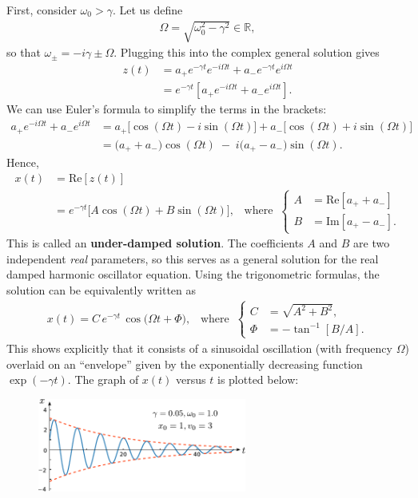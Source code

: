 \documentclass[10pt,a4paper]{article}
\begin{document}
First, consider $\omega_0 > \gamma$.  Let us define
\begin{align}
  \Omega = \sqrt{\omega_0^2 - \gamma^2} \in \mathbb{R},
\end{align}
so that $\omega_\pm = -i\gamma \pm \Omega$. Plugging this into the
complex general solution gives
\begin{align}
  z(t) &= a_+ e^{-\gamma t} e^{-i\Omega t} + a_- e^{-\gamma t} e^{i\Omega t} \\
  &= e^{-\gamma t} \left[a_+ e^{-i\Omega t} + a_- e^{i\Omega t} \right].
\end{align}
We can use Euler's formula to simplify the terms in the brackets:
\begin{align}
  a_+ e^{-i\Omega t} + a_- e^{i\Omega t} &= a_+ \big[\cos(\Omega t)-i\sin(\Omega t)\big] + a_- \big[\cos(\Omega t)+i\sin(\Omega t)\big] \\
  &= \big(a_+ + a_-\big) \cos(\Omega t) \;-\; i \big(a_+ - a_-\big) \sin(\Omega t).
\end{align}
Hence,
\begin{align}
  x(t) &= \mathrm{Re}\left[z(t)\right] \\
  &= e^{-\gamma t} \big[ A\cos\left(\Omega t\right) + B \sin\left(\Omega t\right) \big], \;\;\; \mathrm{where}\;\; \left\{\begin{aligned} A &= \mathrm{Re}\left[a_+ + a_-\right] \\
  B &= \mathrm{Im}\left[a_+ - a_-\right].\end{aligned}\right.
\end{align}
This is called an \textbf{under-damped solution}.  The coefficients
$A$ and $B$ are two independent \textit{real} parameters, so this
serves as a general solution for the real damped harmonic oscillator
equation. Using the trigonometric formulas, the solution can be
equivalently written as
\begin{align}
  x(t) = C \,e^{-\gamma t} \, \cos\!\big(\Omega t + \Phi\big), \;\;\;\mathrm{where}\;\;\left\{\begin{aligned}C &= \sqrt{A^2 + B^2}, \\ \Phi &= - \tan^{-1}\left[B/A\right].\end{aligned}\right.
\end{align}
This shows explicitly that it consists of a sinusoidal oscillation
(with frequency $\Omega$) overlaid on an ``envelope'' given by the
exponentially decreasing function $\exp(-\gamma t)$.  The graph of
$x(t)$ versus $t$ is plotted below:

\begin{figure}[ht]
  \centering\includegraphics[width=0.61\textwidth]{underdamped}
\end{figure}
\end{document}
